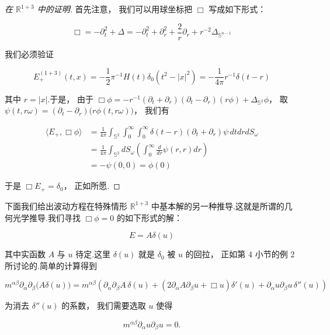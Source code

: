 \begin{proof}[ 在 $\mathbb{R}^{1+3}$ 中的证明]
首先注意， 我们可以用球坐标把 $\Box$ 写成如下形式：

\[
\Box = -\partial_{t}^{2} + \Delta = -\partial_{t}^{2} + \partial_{r}^{2} + \frac{2}{r}\partial_{r} + r^{-2}\Delta_{\mathbb{S}^{n-1}}
\]

我们必须验证

\[
E_{+}^{(1+3)}(t, x) = -\frac{1}{2}\pi^{-1}H(t)\delta_{0}(t^{2}-|x|^{2}) = -\frac{1}{4\pi}r^{-1}\delta(t-r)
\]

其中 $r = |x|$.于是， 由于 $\Box\phi = -r^{-1}(\partial_{t}+\partial_{r})(\partial_{t}-\partial_{r})(r\phi) + \Delta_{\mathbb{S}^{2}}\phi$， 取 $\psi(t, r\omega) = (\partial_{t}-\partial_{r})\bigl(r\phi(t, r\omega)\bigr)$， 我们有

\[
\begin{aligned}
\langle E_{+}, \Box\phi\rangle &= \frac{1}{4\pi}\int_{\mathbb{S}^{2}}\int_{0}^{\infty}\int_{0}^{\infty}\delta(t-r)(\partial_{t}+\partial_{r})\psi\, dtdrdS_{\omega} \\
&= \frac{1}{4\pi}\int_{\mathbb{S}^{2}}dS_{\omega}\left(\int_{0}^{\infty}\frac{d}{dr}\psi(r, r)dr\right) \\
&= -\psi(0, 0) = \phi(0)
\end{aligned}
\]

于是 $\Box E_{+} = \delta_{0}$， 正如所愿.
\end{proof}

下面我们给出波动方程在特殊情形 $\mathbb{R}^{1+3}$ 中基本解的另一种推导.这就是所谓的几何光学推导.我们寻找 $\Box\phi = 0$ 的如下形式的解：

\begin{equation}
E = A\delta(u)\label{eq:c4-148}
\end{equation}

其中实函数 $A$ 与 $u$ 待定.这里 $\delta(u)$ 就是 $\delta_{0}$ 被 $u$ 的回拉， 正如第 4 小节的例 2 所讨论的.简单的计算得到

\[
m^{\alpha\beta}\partial_{\alpha}\partial_{\beta}\bigl(A\delta(u)\bigr) = m^{\alpha\beta}\left(\partial_{\alpha}\partial_{\beta}A\, \delta(u) + \left(2\partial_{\alpha}A\partial_{\beta}u + \Box u\right)\delta'(u) + \partial_{\alpha}u\partial_{\beta}u\, \delta''(u)\right)
\]

为消去 $\delta''(u)$ 的系数， 我们需要选取 $u$ 使得

\begin{equation}
m^{\alpha\beta}\partial_{\alpha}u\partial_{\beta}u = 0.\label{eq:c4-149}
\end{equation}

